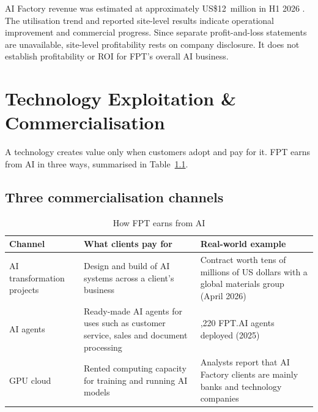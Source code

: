 \documentclass[a4paper,12pt]{report}
\begin{document}
AI Factory revenue was estimated at approximately US\$12~million in H1 2026 \cite{S4}. The utilisation trend and reported site-level results indicate operational improvement and commercial progress. Since separate profit-and-loss statements are unavailable, site-level profitability rests on company disclosure. It does not establish profitability or ROI for FPT's overall AI business.



\chapter{Technology Exploitation \& Commercialisation}

A technology creates value only when customers adopt and pay for it. FPT earns from AI in three ways, summarised in Table~\ref{tab:channels}.

\section{Three commercialisation channels}

\begin{table}[htbp]
  \centering
  \small
  \caption{How FPT earns from AI}
  \label{tab:channels}
  \begin{tabular}{>{\raggedright\arraybackslash}p{2.8cm}>{\raggedright\arraybackslash}p{4.6cm}>{\raggedright\arraybackslash}p{6.4cm}}
    \toprule
    \textbf{Channel} & \textbf{What clients pay for} & \textbf{Real-world example} \\
    \midrule
    AI transformation projects & Design and build of AI systems across a client's business & Contract worth tens of millions of US dollars with a global materials group (April 2026) \cite{S25} \\ \addlinespace
    AI agents & Ready-made AI agents for uses such as customer service, sales and document processing & 10,220 FPT.AI agents deployed (2025) \cite{A26} \\ \addlinespace
    GPU cloud & Rented computing capacity for training and running AI models & Analysts report that AI Factory clients are mainly banks and technology companies \cite{M6} \\
    \bottomrule
  \end{tabular}
\end{table}
\end{document}

